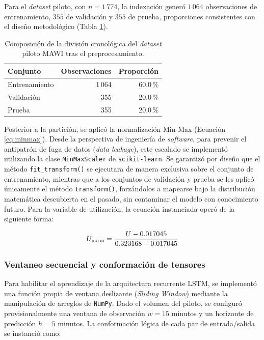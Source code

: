 \documentclass[12pt]{report}
\begin{document}
Para el \textit{dataset} piloto, con $n=1\,774$, la indexación generó $1\,064$ observaciones de entrenamiento, $355$ de validación y $355$ de prueba, proporciones consistentes con el diseño metodológico (Tabla \ref{tab:split_mawi_piloto}).

\begin{table}[H]
    \centering
    \begin{tabular}{|l|r|r|}
        \hline
        \textbf{Conjunto} & \textbf{Observaciones} & \textbf{Proporción} \\
        \hline
        Entrenamiento & 1\,064 & 60.0\,\% \\
        Validación & 355 & 20.0\,\% \\
        Prueba & 355 & 20.0\,\% \\
        \hline
    \end{tabular}
    \caption{Composición de la división cronológica del \textit{dataset} piloto MAWI tras el preprocesamiento.}
    \label{tab:split_mawi_piloto}
\end{table}

Posterior a la partición, se aplicó la normalización Min-Max (Ecuación \ref{eq:minmax}). Desde la perspectiva de ingeniería de \textit{software}, para prevenir el antipatrón de fuga de datos (\textit{data leakage}), este escalado se implementó utilizando la clase \texttt{MinMaxScaler} de \texttt{scikit-learn}. Se garantizó por diseño que el método 
\texttt{fit\_transform()} se ejecutara de manera exclusiva sobre el conjunto de entrenamiento, mientras que a los conjuntos de validación y prueba se les aplicó únicamente el método \texttt{transform()}, forzándolos a mapearse bajo la distribución matemática descubierta en el pasado, sin contaminar el modelo con conocimiento futuro. Para la variable 
de utilización, la ecuación instanciada operó de la siguiente forma:

\begin{equation}
    U_{\mbox{\scriptsize norm}} = \frac{U - 0.017045}{0.323168 - 0.017045}
    \label{eq:minmax_instanciada_mawi}
\end{equation}

\subsubsection*{Ventaneo secuencial y conformación de tensores}

Para habilitar el aprendizaje de la arquitectura recurrente LSTM, se implementó una función propia de ventana deslizante (\textit{Sliding Window}) mediante la manipulación de arreglos de \texttt{NumPy}. Dado el volumen del piloto, se configuró provisionalmente una ventana de observación $w=15$ minutos y un horizonte de predicción $h=5$ minutos. 
La conformación lógica de cada par de entrada/salida se instanció como:
\end{document}
